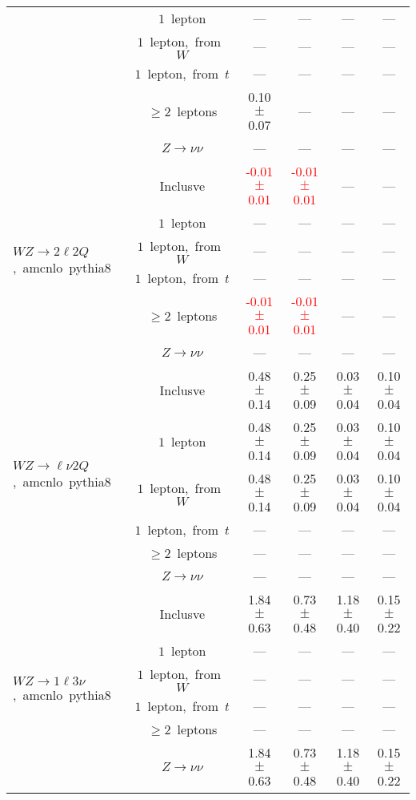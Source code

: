 \documentclass{article}
\begin{document}
\begin{longtable}{|l|c|c|c|c|c|}
 & $1$~lepton  & ---  & ---  & ---  & --- \\* 
 & $1$~lepton,~from~$W$  & ---  & ---  & ---  & --- \\* 
 & $1$~lepton,~from~$t$  & ---  & ---  & ---  & --- \\* 
 & $\ge2$~leptons  & 0.10 $\pm$ 0.07  & ---  & ---  & --- \\* 
 & $Z\rightarrow\nu\nu$  & ---  & ---  & ---  & --- \\* 
\hline 
\multirow{6}{*}{$WZ{\rightarrow}2{\ell}2Q$,~amcnlo~pythia8} & Inclusve  & \textcolor{red}{ -0.01 $\pm$ 0.01 }  & \textcolor{red}{ -0.01 $\pm$ 0.01 }  & ---  & --- \\* 
 & $1$~lepton  & ---  & ---  & ---  & --- \\* 
 & $1$~lepton,~from~$W$  & ---  & ---  & ---  & --- \\* 
 & $1$~lepton,~from~$t$  & ---  & ---  & ---  & --- \\* 
 & $\ge2$~leptons  & \textcolor{red}{ -0.01 $\pm$ 0.01 }  & \textcolor{red}{ -0.01 $\pm$ 0.01 }  & ---  & --- \\* 
 & $Z\rightarrow\nu\nu$  & ---  & ---  & ---  & --- \\* 
\hline 
\multirow{6}{*}{$WZ{\rightarrow}{\ell}{\nu}2Q$,~amcnlo~pythia8} & Inclusve  & 0.48 $\pm$ 0.14  & 0.25 $\pm$ 0.09  & 0.03 $\pm$ 0.04  & 0.10 $\pm$ 0.04 \\* 
 & $1$~lepton  & 0.48 $\pm$ 0.14  & 0.25 $\pm$ 0.09  & 0.03 $\pm$ 0.04  & 0.10 $\pm$ 0.04 \\* 
 & $1$~lepton,~from~$W$  & 0.48 $\pm$ 0.14  & 0.25 $\pm$ 0.09  & 0.03 $\pm$ 0.04  & 0.10 $\pm$ 0.04 \\* 
 & $1$~lepton,~from~$t$  & ---  & ---  & ---  & --- \\* 
 & $\ge2$~leptons  & ---  & ---  & ---  & --- \\* 
 & $Z\rightarrow\nu\nu$  & ---  & ---  & ---  & --- \\* 
\hline 
\multirow{6}{*}{$WZ{\rightarrow}1{\ell}3{\nu}$,~amcnlo~pythia8} & Inclusve  & 1.84 $\pm$ 0.63  & 0.73 $\pm$ 0.48  & 1.18 $\pm$ 0.40  & 0.15 $\pm$ 0.22 \\* 
 & $1$~lepton  & ---  & ---  & ---  & --- \\* 
 & $1$~lepton,~from~$W$  & ---  & ---  & ---  & --- \\* 
 & $1$~lepton,~from~$t$  & ---  & ---  & ---  & --- \\* 
 & $\ge2$~leptons  & ---  & ---  & ---  & --- \\* 
 & $Z\rightarrow\nu\nu$  & 1.84 $\pm$ 0.63  & 0.73 $\pm$ 0.48  & 1.18 $\pm$ 0.40  & 0.15 $\pm$ 0.22 \\* 

\end{longtable}
\end{document}
